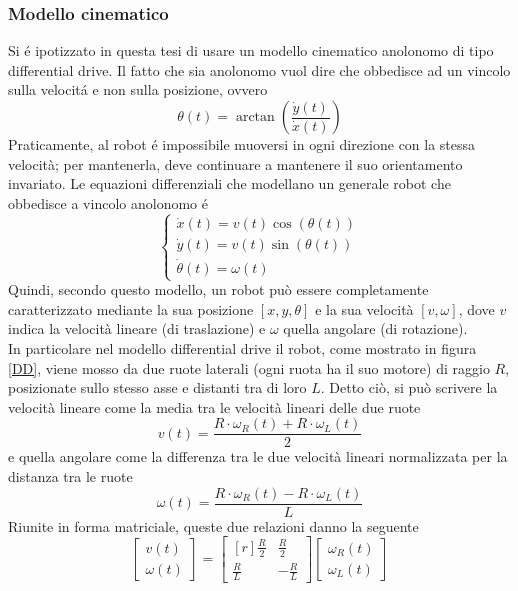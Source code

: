 \documentclass[14pt,a4paper]{extarticle}
\begin{document}
\subsubsection{Modello cinematico}
Si é ipotizzato in questa tesi di usare un modello cinematico anolonomo di tipo differential drive. Il fatto che sia anolonomo vuol dire che obbedisce ad un vincolo sulla velocitá e non sulla posizione, ovvero \[\theta(t) = \arctan \left( \frac{\dot{y}(t)}{\dot{x}(t)} \right) \] Praticamente, al robot é impossibile muoversi in ogni direzione con la stessa velocità; per mantenerla, deve continuare a mantenere il suo orientamento invariato. Le equazioni differenziali che modellano un generale robot che obbedisce a vincolo anolonomo é
\begin{equation}
\label{anolomeq}
\begin{cases}
\dot{x}(t) = v(t)\cos(\theta(t)) \\
\dot{y}(t) = v(t)\sin(\theta(t)) \\
\dot{\theta}(t) = \omega(t)
\end{cases}
\end{equation} 
Quindi, secondo questo modello, un robot può essere completamente caratterizzato mediante la sua posizione \([x,y,\theta]\) e la sua velocità \([v,\omega]\), dove \(v\) indica la velocità lineare (di traslazione) e \(\omega\) quella angolare (di rotazione).\\
In particolare nel modello differential drive il robot, come mostrato in figura \ref{DD}, viene mosso da due ruote laterali (ogni ruota ha il suo motore) di raggio \(R\), posizionate sullo stesso asse e distanti tra di loro \(L\). Detto ciò, si può scrivere la velocità lineare come la media tra le velocità lineari delle due ruote \[v(t)=\frac{R\cdot\omega_R(t)+R\cdot\omega_L(t)}{2}\] e quella angolare come la differenza tra le due velocità lineari normalizzata per la distanza tra le ruote \[\omega(t)=\frac{R\cdot\omega_R(t)-R\cdot\omega_L(t)}{L}\] Riunite in forma matriciale, queste due relazioni danno la seguente
\begin{equation}
\begin{bmatrix}
v(t) \\
\omega(t)
\end{bmatrix}
=
\begin{bmatrix*}[r]
\frac{R}{2} & \frac{R}{2} \\
\frac{R}{L} & -\frac{R}{L}
\end{bmatrix*}
\begin{bmatrix}
\omega_R(t) \\
\omega_L(t)
\end{bmatrix}
\end{equation} 
\end{document}
